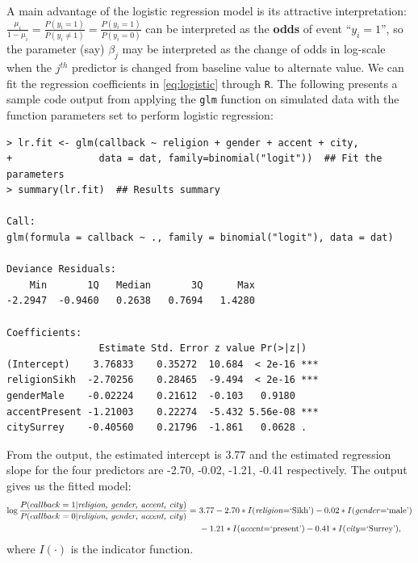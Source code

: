 \documentclass[11pt]{article}
\begin{document}
A main advantage of the logistic regression model is its attractive interpretation: $\frac{\mu_i}{1-\mu_i} = \frac{P(y_i=1)}{P(y_i\neq 1)} = \frac{P(y_i=1)}{P(y_i=0)}$ can be interpreted as the \textbf{odds} of event ``$y_i=1$'', so the parameter (say) $\beta_j$ may be interpreted as the change of odds in log-scale when the $j^{th}$ predictor is changed from baseline value to alternate value. We can fit the regression coefficients in \autoref{eq:logistic} through \texttt{R}. The following presents a sample code output from applying the \texttt{glm} function on simulated data with the function parameters set to perform logistic regression:
\begin{verbatim}
> lr.fit <- glm(callback ~ religion + gender + accent + city, 
+               data = dat, family=binomial("logit"))  ## Fit the parameters
> summary(lr.fit)  ## Results summary

Call:
glm(formula = callback ~ ., family = binomial("logit"), data = dat)

Deviance Residuals: 
    Min       1Q   Median       3Q      Max  
-2.2947  -0.9460   0.2638   0.7694   1.4280  

Coefficients:
                Estimate Std. Error z value Pr(>|z|)    
(Intercept)    3.76833    0.35272  10.684  < 2e-16 ***
religionSikh  -2.70256    0.28465  -9.494  < 2e-16 ***
genderMale    -0.02224    0.21612  -0.103   0.9180    
accentPresent -1.21003    0.22274  -5.432 5.56e-08 ***
citySurrey    -0.40560    0.21796  -1.861   0.0628 .  
\end{verbatim}
From the output, the estimated intercept is 3.77 and the estimated regression slope for the four predictors are  -2.70, -0.02, -1.21, -0.41 respectively. The output gives us the fitted model:
\begin{equation}
    \begin{split}
     \log\frac{P(callback = 1|\textnormal{\textit{religion, gender, accent, city}})}{P(callback=0|\textnormal{\textit{religion, gender, accent, city}})} =\ & 3.77 -2.70*I\textnormal{(\textit{religion}=`Sikh')}  -0.02 *I\textnormal{(\textit{gender}=`male')}  \\ & -1.21*I\textnormal{(\textit{accent}=`present')}  -0.41*I\textnormal{(\textit{city}=`Surrey')},
    \end{split}
\end{equation}
where $I(\cdot)$ is the indicator function.
\end{document}
